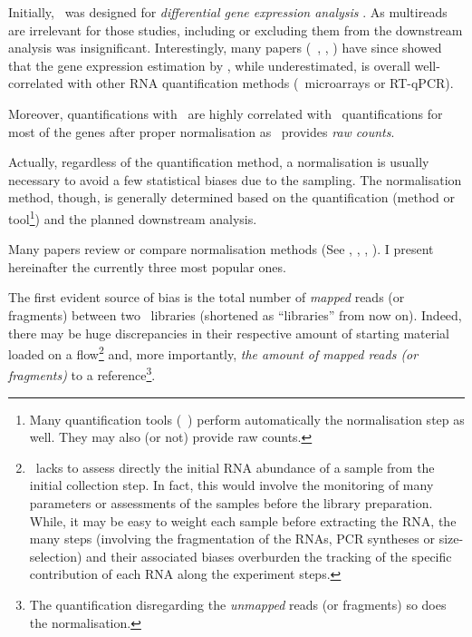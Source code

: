 Initially, \htseq\ was designed for \emph{differential gene
expression analysis} . As multireads are irrelevant for
those studies, including or excluding them from the downstream analysis was
insignificant. Interestingly, many papers (\eg\ \cite{Fonseca2014},
\cite{errorsRNAquant}, \cite{tophatStarwhatever}) have since showed that
the gene expression estimation by \htseq, while underestimated, is overall
well-correlated with other \gls{RNA} quantification methods
(\eg\ microarrays or \gls{RT-qPCR}).

Moreover, quantifications with \htseq\ are highly correlated with \cuffl\
quantifications for most of the genes after proper normalisation
\mycite{tophatStarwhatever} as \htseq\ provides \emph{raw counts}.


Actually, regardless of the quantification method, a normalisation is usually
necessary to avoid a few statistical biases due to the sampling. The
normalisation method, though, is generally determined based on the quantification
(method or tool\footnote{Many quantification tools (\eg\ \cuffl) perform
automatically the normalisation step as well. They may also (or not) provide
raw counts.}) and the planned downstream analysis.

Many papers review or compare normalisation methods (See \cite{Dillies2013},
\cite{normSigCancerHelp}, \cite{NormImpact}, \cite{ruvseqComQN}). I present
hereinafter the currently three most popular ones.

The first evident source of bias is the total number of \emph{mapped} reads (or
fragments) between two \Rnaseq\ libraries (shortened as ``libraries'' from now
on). Indeed, there may be huge discrepancies in their respective amount of
starting material loaded on a \gls{flow}\footnote{\Rnaseq\ lacks to assess
directly the initial \gls{RNA} abundance of a sample from the initial collection
step. In fact, this would involve the monitoring of many parameters or
assessments of the samples before the library preparation. While, it may be easy
to weight each sample before extracting the \gls{RNA},
the many steps (involving the fragmentation of the \glspl{RNA},
\gls{PCR} syntheses or size-selection) and their associated biases
overburden the tracking of the specific contribution of each \gls{RNA} along the
experiment steps.} and, more importantly, \emph{the amount of mapped reads (or
fragments)} to a reference\footnote{The quantification disregarding the
\emph{unmapped} reads (or fragments) so does the normalisation.}.

